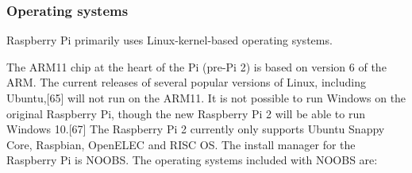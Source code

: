 \documentclass{acm_proc_article-sp}
\begin{document}
\subsubsection{Operating systems}
Raspberry Pi primarily uses Linux-kernel-based operating systems.

The ARM11 chip at the heart of the Pi (pre-Pi 2) is based on version 6 of the ARM. The current releases of several popular versions of Linux, including Ubuntu,[65] will not run on the ARM11. It is not possible to run Windows on the original Raspberry Pi, though the new Raspberry Pi 2 will be able to run Windows 10.[67] The Raspberry Pi 2 currently only supports Ubuntu Snappy Core, Raspbian, OpenELEC and RISC OS.
\newline
\newline
The install manager for the Raspberry Pi is NOOBS. The operating systems included with NOOBS are:
\end{document}
